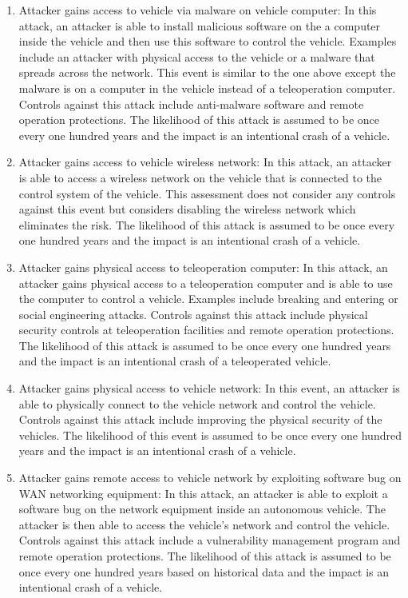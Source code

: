 \documentclass{article}
\begin{document}
\begin{enumerate}
\item Attacker gains access to vehicle via malware on vehicle computer: In this attack, an attacker is able to install malicious software on the a computer inside the vehicle and then use this software to control the vehicle. Examples include an attacker with physical access to the vehicle or a malware that spreads across the network. This event is similar to the one above except the malware is on a computer in the vehicle instead of a teleoperation computer. Controls against this attack include anti-malware software and remote operation protections. The likelihood of this attack is assumed to be once every one hundred years and the impact is an intentional crash of a vehicle.
\item Attacker gains access to vehicle wireless network: In this attack, an attacker is able to access a wireless network on the vehicle that is connected to the control system of the vehicle. This assessment does not consider any controls against this event but considers disabling the wireless network which eliminates the risk. The likelihood of this attack is assumed to be once every one hundred years and the impact is an intentional crash of a vehicle.
\item Attacker gains physical access to teleoperation computer: In this attack, an attacker gains physical access to a teleoperation computer and is able to use the computer to control a vehicle. Examples include breaking and entering or social engineering attacks. Controls against this attack include physical security controls at teleoperation facilities and remote operation protections. The likelihood of this attack is assumed to be once every one hundred years and the impact is an intentional crash of a teleoperated vehicle.
\item Attacker gains physical access to vehicle network: In this event, an attacker is able to physically connect to the vehicle network and control the vehicle. Controls against this attack include improving the physical security of the vehicles. The likelihood of this event is assumed to be once every one hundred years and the impact is an intentional crash of a vehicle.
\item Attacker gains remote access to vehicle network by exploiting software bug on WAN networking equipment:  In this attack, an attacker is able to exploit a software bug on the network equipment inside an autonomous vehicle. The attacker is then able to access the vehicle's network and control the vehicle. Controls against this attack include a vulnerability management program and remote operation protections. The likelihood of this attack is assumed to be once every one hundred years based on historical data and the impact is an intentional crash of a vehicle.

\end{enumerate}
\end{document}
